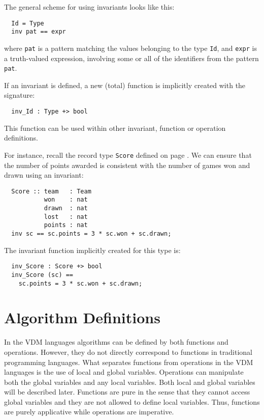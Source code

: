 \documentclass{overturerepchap}
\begin{document}
The general scheme for using invariants looks like this:

\begin{lstlisting}
  Id = Type
  inv pat == expr
\end{lstlisting}

\noindent where {\tt pat} is a pattern matching the values belonging to the type
{\tt Id}, and {\tt expr} is a truth-valued expression, involving some or
all of the identifiers from the pattern {\tt pat}.

If an invariant is defined, a new (total) function is implicitly
created with the signature:
\begin{lstlisting}
  inv_Id : Type +> bool
\end{lstlisting}
This function can be used within other invariant, function or operation
definitions.

For instance, recall the record type \texttt{Score} defined on page
\pageref{scoredef}. We can ensure that the number of points awarded
is consistent with the number of games won and drawn using an invariant:
\begin{lstlisting}
  Score :: team   : Team
           won    : nat
           drawn  : nat
           lost   : nat
           points : nat
  inv sc == sc.points = 3 * sc.won + sc.drawn;
\end{lstlisting}
The invariant function implicitly created for this type is:
\begin{lstlisting}
  inv_Score : Score +> bool
  inv_Score (sc) ==
    sc.points = 3 * sc.won + sc.drawn;
\end{lstlisting}

\chapter{Algorithm Definitions}
\label{algorithm}


In the VDM languages algorithms can be defined by both
functions and operations.  However, they do not directly correspond to
functions in traditional programming languages. What separates
functions from operations in the VDM languages is the use of
local and global variables. Operations can manipulate both the global
variables and any local variables.  Both
local and global variables will be described later. Functions are pure in
the sense that they cannot access global variables and they are not
allowed to define local variables. Thus, functions are purely
applicative while operations are imperative.
\end{document}
